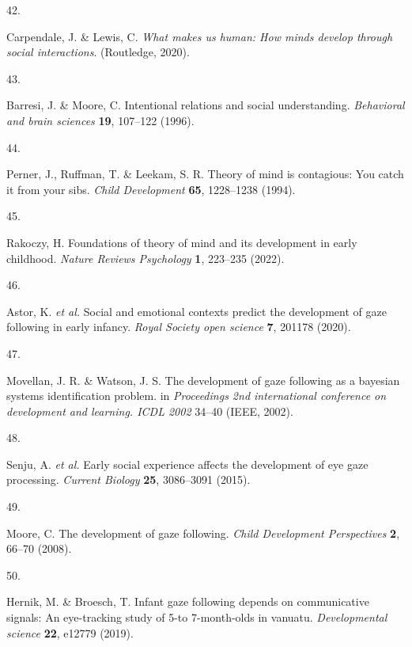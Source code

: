 \documentclass[
  man,floatsintext]{apa6}
\newlength{\cslhangindent}
\newlength{\csllabelwidth}
\newlength{\cslentryspacingunit} %
\newenvironment{CSLReferences}[2] %
 {%
  \setlength{\parindent}{0pt}
  \ifodd #1
  \let\oldpar\par
  \def\par{\hangindent=\cslhangindent\oldpar}
  \fi
  \setlength{\parskip}{#2\cslentryspacingunit}
 }%
 {}
\newcommand{\CSLLeftMargin}[1]{\parbox[t]{\csllabelwidth}{#1}}
\newcommand{\CSLRightInline}[1]{\parbox[t]{\linewidth - \csllabelwidth}{#1}\break}
\begin{document}
\begin{CSLReferences}{0}{0}
\leavevmode{}%
\CSLLeftMargin{42. }%
\CSLRightInline{Carpendale, J. \& Lewis, C. \emph{What makes us human: How minds develop through social interactions}. (Routledge, 2020).}

\leavevmode{}%
\CSLLeftMargin{43. }%
\CSLRightInline{Barresi, J. \& Moore, C. Intentional relations and social understanding. \emph{Behavioral and brain sciences} \textbf{19}, 107--122 (1996).}

\leavevmode{}%
\CSLLeftMargin{44. }%
\CSLRightInline{Perner, J., Ruffman, T. \& Leekam, S. R. Theory of mind is contagious: You catch it from your sibs. \emph{Child Development} \textbf{65}, 1228--1238 (1994).}

\leavevmode{}%
\CSLLeftMargin{45. }%
\CSLRightInline{Rakoczy, H. Foundations of theory of mind and its development in early childhood. \emph{Nature Reviews Psychology} \textbf{1}, 223--235 (2022).}

\leavevmode{}%
\CSLLeftMargin{46. }%
\CSLRightInline{Astor, K. \emph{et al.} Social and emotional contexts predict the development of gaze following in early infancy. \emph{Royal Society open science} \textbf{7}, 201178 (2020).}

\leavevmode{}%
\CSLLeftMargin{47. }%
\CSLRightInline{Movellan, J. R. \& Watson, J. S. The development of gaze following as a bayesian systems identification problem. in \emph{Proceedings 2nd international conference on development and learning. ICDL 2002} 34--40 (IEEE, 2002).}

\leavevmode{}%
\CSLLeftMargin{48. }%
\CSLRightInline{Senju, A. \emph{et al.} Early social experience affects the development of eye gaze processing. \emph{Current Biology} \textbf{25}, 3086--3091 (2015).}

\leavevmode{}%
\CSLLeftMargin{49. }%
\CSLRightInline{Moore, C. The development of gaze following. \emph{Child Development Perspectives} \textbf{2}, 66--70 (2008).}

\leavevmode{}%
\CSLLeftMargin{50. }%
\CSLRightInline{Hernik, M. \& Broesch, T. Infant gaze following depends on communicative signals: An eye-tracking study of 5-to 7-month-olds in vanuatu. \emph{Developmental science} \textbf{22}, e12779 (2019).}


\end{CSLReferences}
\end{document}
